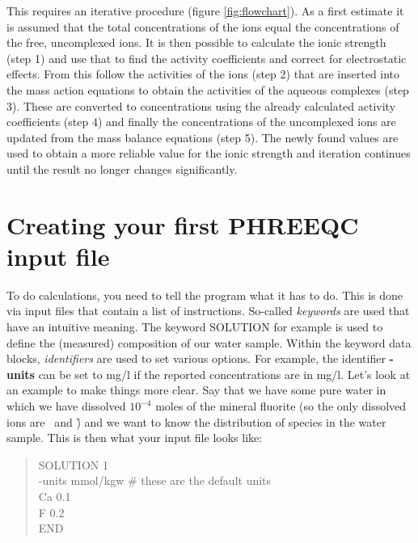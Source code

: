 This requires an iterative procedure (figure \ref{fig:flowchart}). As a first estimate it is assumed that the total concentrations of the ions equal the concentrations of the free, uncomplexed ions. It is then possible to calculate the ionic strength (step 1) and use that to find the activity coefficients and correct for electrostatic effects. From this follow the activities of the ions (step 2) that are inserted into the mass action equations to obtain the activities of the aqueous complexes (step 3). These are converted to concentrations using the already calculated activity coefficients (step 4) and finally the concentrations of the uncomplexed ions are updated from the mass balance equations (step 5). The newly found values are used to obtain a more reliable value for the ionic strength and iteration continues until the result no longer changes significantly.

\newpage

\section{Creating your first PHREEQC input file}
To do calculations, you need to tell the program what it has to do. This is done via input files that
contain a list of instructions. So-called \textit{keywords} are used that have an intuitive meaning. The keyword
SOLUTION for example is used to define the (measured) composition of our water sample. Within
the keyword data blocks, \textit{identifiers} are used to set various options. For example, the identifier \textbf{-units}
can be set to mg/l if the reported concentrations are in mg/l.
Let's look at an example to make things more clear. Say that we have some pure water in which we
have dissolved $10^{-4}$ moles of the mineral fluorite (so the only dissolved ions are \ca\ and \f) and we want to know
the distribution of species in the water sample. This is then what your input file looks like:

\begin{quote}
SOLUTION 1 \\
-units mmol/kgw \# these are the default units \\
Ca 0.1 \\
F 0.2 \\
END \\
\end{quote}

